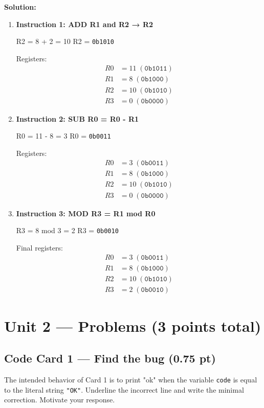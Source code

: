 \documentclass[10pt]{article}
\begin{document}
\begin{enumerate}
\textbf{Solution:}
\begin{enumerate}
\item \textbf{Instruction 1: ADD R1 and R2 → R2}  

R2 = 8 + 2 = 10  
R2 = \texttt{0b1010}

Registers:  
\[
\begin{aligned}
R0 &= 11\;(\texttt{0b1011})\\
R1 &= 8\;(\texttt{0b1000})\\
R2 &= 10\;(\texttt{0b1010})\\
R3 &= 0\;(\texttt{0b0000})
\end{aligned}
\]

\item \textbf{Instruction 2: SUB R0 = R0 - R1}  

R0 = 11 - 8 = 3  
R0 = \texttt{0b0011}

Registers:  
\[
\begin{aligned}
R0 &= 3\;(\texttt{0b0011})\\
R1 &= 8\;(\texttt{0b1000})\\
R2 &= 10\;(\texttt{0b1010})\\
R3 &= 0\;(\texttt{0b0000})
\end{aligned}
\]

\item \textbf{Instruction 3: MOD R3 = R1 mod R0}  

R3 = 8 mod 3 = 2  
R3 = \texttt{0b0010}

Final registers:  
\[
\begin{aligned}
R0 &= 3\;(\texttt{0b0011})\\
R1 &= 8\;(\texttt{0b1000})\\
R2 &= 10\;(\texttt{0b1010})\\
R3 &= 2\;(\texttt{0b0010})
\end{aligned}
\]
\end{enumerate}

\end{enumerate}


\section*{Unit 2 --- Problems (3 points total)}
\subsection*{Code Card 1 — Find the bug (0.75 pt)}
The intended behavior of Card 1 is to print "ok" when the variable \verb|code| is equal to the literal string \verb|"OK"|. Underline the incorrect line and write the minimal correction. Motivate your response.
\end{document}
